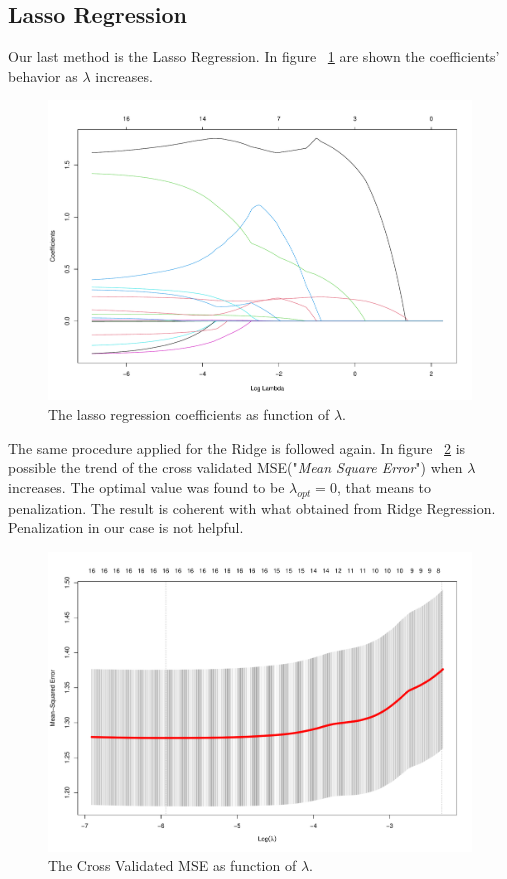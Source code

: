 \subsection{Lasso Regression}

Our last method is the Lasso Regression. In figure \Fig~\ref{fig:LassoCoefVsLambda} are shown the coefficients' behavior as $\lambda$ increases. 

\begin{figure}[h]
	\centering
	\includegraphics[width=0.4\linewidth]{ImageFiles/Regression/Lasso/LassoCoefVsLambda}
	\caption{The lasso regression coefficients as function of $\lambda$.}
	\label{fig:LassoCoefVsLambda}
\end{figure}

The same procedure applied for the Ridge is followed again. In figure \Fig~\ref{fig:LassoCvPlot} is possible the trend of the cross validated MSE("\textit{Mean Square Error}") when $\lambda$ increases. The optimal value was found to be $\lambda_{opt} = 0$, that means to penalization. The result is coherent with what obtained from Ridge Regression. Penalization in our case is not helpful.

\begin{figure}[h]
	\centering
	\includegraphics[width=0.5\linewidth]{ImageFiles/Regression/Lasso/LassoCvPlot}
	\caption{The Cross Validated MSE as function of $\lambda$.}
	\label{fig:LassoCvPlot}
\end{figure}